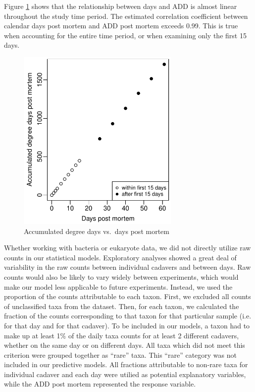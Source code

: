 \documentclass{article}
\begin{document}
Figure \ref{fig:degdays_vs_days} shows that the relationship between
days and ADD is almost linear throughout the study time period.  The
estimated correlation coefficient between calendar days post mortem
and ADD post mortem exceeds 0.99.  This is true when accounting for
the entire time period, or when examining only the first 15 days.
\begin{figure}[hb]
  \centering
  \includegraphics[height=3.5in]{degdays_vs_days}
  \caption{Accumulated degree days vs.~days post mortem}
  \label{fig:degdays_vs_days}
\end{figure}

Whether working with bacteria or eukaryote data, we did not directly
utilize raw counts in our statistical models.  Exploratory analyses
showed a great deal of variability in the raw counts between
individual cadavers and between days.  Raw counts would also be likely
to vary widely between experiments, which would make our model less
applicable to future experiments.  Instead, we used the proportion of
the counts attributable to each taxon.  First, we excluded all counts
of unclassified taxa from the dataset.  Then, for each taxon, we
calculated the fraction of the counts corresponding to that taxon for
that particular sample (i.e. for that day and for that cadaver).  To
be included in our models, a taxon had to make up at least 1\% of the
daily taxa counts for at least 2 different cadavers, whether on the
same day or on different days.  All taxa which did not meet this
criterion were grouped together as ``rare'' taxa.  This ``rare''
category was not included in our predictive models.  All fractions
attributable to non-rare taxa for individual cadaver and each day were
utilied as potential explanatory variables, while the ADD post mortem
represented the response variable.
\end{document}
